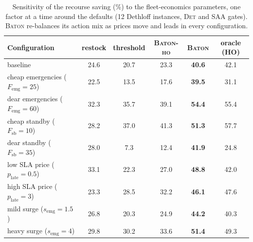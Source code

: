 \begin{table}[t]
\caption{Sensitivity of the recourse saving (\%) to the fleet-economics
parameters, one factor at a time around the defaults (12 Dethloff
instances, \textsc{Det} and \textsc{SAA} gates). \textsc{Baton}
re-balances its action mix as prices move and leads in every
configuration.}
\label{tab:costsens}
\centering
\footnotesize
\setlength{\tabcolsep}{4pt}
\begin{tabular}{l ccccc}
\toprule
Configuration & restock & threshold & \textsc{Baton-ho} &
\textsc{Baton} & oracle (HO) \\
\midrule
baseline & 24.6 & 20.7 & 23.3 & \textbf{40.6} & 42.1 \\
cheap emergencies ($F_{\mathrm{emg}}{=}25$) & 22.5 & 13.5 & 17.6 & \textbf{39.5} & 31.1 \\
dear emergencies ($F_{\mathrm{emg}}{=}60$) & 32.3 & 35.7 & 39.1 & \textbf{54.4} & 55.4 \\
cheap standby ($F_{\mathrm{sb}}{=}10$) & 28.2 & 37.0 & 41.3 & \textbf{51.3} & 57.7 \\
dear standby ($F_{\mathrm{sb}}{=}35$) & 28.0 & 7.3 & 12.4 & \textbf{41.9} & 24.8 \\
low SLA price ($p_{\mathrm{late}}{=}0.5$) & 33.1 & 22.3 & 27.0 & \textbf{48.8} & 42.0 \\
high SLA price ($p_{\mathrm{late}}{=}3$) & 23.3 & 28.5 & 32.2 & \textbf{46.1} & 47.6 \\
mild surge ($s_{\mathrm{emg}}{=}1.5$) & 26.8 & 20.3 & 24.9 & \textbf{44.2} & 40.3 \\
heavy surge ($s_{\mathrm{emg}}{=}4$) & 29.8 & 30.2 & 33.6 & \textbf{51.4} & 49.3 \\
\bottomrule
\end{tabular}
\end{table}
